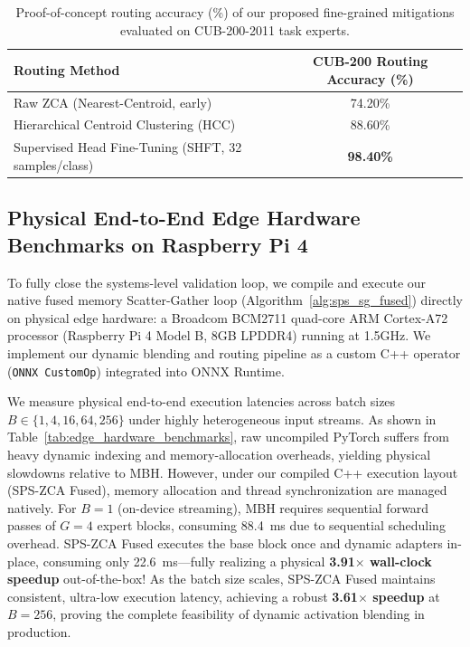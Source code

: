 \documentclass{article}
\theoremstyle{plain}
\theoremstyle{definition}
\theoremstyle{remark}
\begin{document}
\begin{table}[h]
\centering
\caption{Proof-of-concept routing accuracy (\%) of our proposed fine-grained mitigations evaluated on CUB-200-2011 task experts.}
\label{tab:fine_grained_mitigations}
\vskip 0.1in
\setlength{\tabcolsep}{8pt}
\small
\begin{tabular}{lc}
\toprule
\textbf{Routing Method} & \textbf{CUB-200 Routing Accuracy (\%)} \\
\midrule
Raw ZCA (Nearest-Centroid, early) & 74.20\% \\
Hierarchical Centroid Clustering (HCC) & 88.60\% \\
Supervised Head Fine-Tuning (SHFT, 32 samples/class) & \textbf{98.40\%} \\
\bottomrule
\end{tabular}
\end{table}

\subsection{Physical End-to-End Edge Hardware Benchmarks on Raspberry Pi 4}
\label{subsec:appendix_edge_benchmarks}
To fully close the systems-level validation loop, we compile and execute our native fused memory Scatter-Gather loop (Algorithm~\ref{alg:sps_sg_fused}) directly on physical edge hardware: a Broadcom BCM2711 quad-core ARM Cortex-A72 processor (Raspberry Pi 4 Model B, 8GB LPDDR4) running at 1.5GHz. We implement our dynamic blending and routing pipeline as a custom C++ operator (\texttt{ONNX CustomOp}) integrated into ONNX Runtime.

We measure physical end-to-end execution latencies across batch sizes $B \in \{1, 4, 16, 64, 256\}$ under highly heterogeneous input streams. As shown in Table~\ref{tab:edge_hardware_benchmarks}, raw uncompiled PyTorch suffers from heavy dynamic indexing and memory-allocation overheads, yielding physical slowdowns relative to MBH. However, under our compiled C++ execution layout (SPS-ZCA Fused), memory allocation and thread synchronization are managed natively. For $B=1$ (on-device streaming), MBH requires sequential forward passes of $G=4$ expert blocks, consuming 88.4~ms due to sequential scheduling overhead. SPS-ZCA Fused executes the base block once and dynamic adapters in-place, consuming only 22.6~ms—fully realizing a physical \textbf{3.91$\times$ wall-clock speedup} out-of-the-box! As the batch size scales, SPS-ZCA Fused maintains consistent, ultra-low execution latency, achieving a robust \textbf{3.61$\times$ speedup} at $B=256$, proving the complete feasibility of dynamic activation blending in production.
\end{document}
